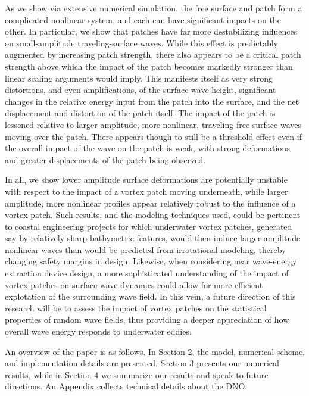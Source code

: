 \documentclass[a4paper,11pt]{article}
\begin{document}
As we show via extensive numerical simulation, the free surface and patch form a complicated nonlinear system, and each can have significant impacts on the other.  In particular, we show that patches have far more destabilizing influences on small-amplitude traveling-surface waves.  While this effect is predictably augmented by increasing patch strength, there also appears to be a critical patch strength above which the impact of the patch becomes markedly stronger than linear scaling arguments would imply.  This manifests itself as very strong distortions, and even amplifications, of the surface-wave height, significant changes in the relative energy input from the patch into the surface, and the net displacement and distortion of the patch itself.  The impact of the patch is lessened relative to larger amplitude, more nonlinear, traveling free-surface waves moving over the patch.  There appears though to still be a threshold effect even if the overall impact of the wave on the patch is weak, with strong deformations and greater displacements of the patch being observed.  

In all, we show lower amplitude surface deformations are potentially unstable with respect to the impact of a vortex patch moving underneath, while larger amplitude, more nonlinear profiles appear relatively robust to the influence of a vortex patch.  Such results, and the modeling techniques used, could be pertinent to coastal engineering projects for which underwater vortex patches, generated say by relatively sharp bathymetric features, would then induce larger amplitude nonlinear waves than would be predicted from irrotational modeling, thereby changing safety margins in design.  Likewise, when considering near wave-energy extraction device design, a more sophisticated understanding of the impact of vortex patches on surface wave dynamics could allow for more efficient explotation of the surrounding wave field.  In this vein, a future direction of this research will be to assess the impact of vortex patches on the statistical properties of random wave fields, thus providing a deeper appreciation of how overall wave energy responds to underwater eddies.  

An overview of the paper is as follows.  In Section 2, the model, numerical scheme, and implementation details are presented.  Section 3 presents our numerical results, while in Section 4 we summarize our results and speak to future directions.  An Appendix collects technical details about the DNO.  
\end{document}
